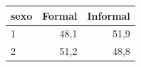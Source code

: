 \begin{tabular}{lrr}
\toprule
sexo & Formal & Informal \\
\midrule
1 & 48,1 & 51,9 \\
2 & 51,2 & 48,8 \\
\bottomrule
\end{tabular}
